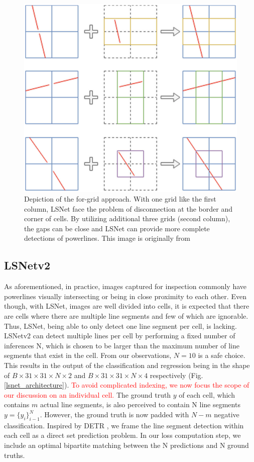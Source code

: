 \documentclass[journal]{IEEEtran}
\begin{document}
\begin{figure}
  \includegraphics[width=\linewidth]{imgs/others/4grid.png}
  \caption{Depiction of the for-grid approach. With one grid like the first column, LSNet face the problem of disconnection at the border and corner of cells. By utilizing additional three grids (second column), the gaps can be close and LSNet can provide more complete detections of powerlines. This image is originally from \cite{Nguyen2020}}
  \label{4grid}
\end{figure}


\subsection{LSNetv2}
As aforementioned, in practice, images captured for inspection commonly have powerlines visually intersecting or being in close proximity to each other. Even though, with LSNet, images are well divided into cells, it is expected that there are cells where there are multiple line segments and few of which are ignorable. Thus, LSNet, being able to only detect one line segment per cell, is lacking. LSNetv2 can detect multiple lines per cell by performing a fixed number of inferences N, which is chosen to be larger than the maximum number of line segments that exist in the cell. From our observations, $N=10$ is a safe choice. This results in the output of the classification and regression being in the shape of $B \times 31 \times 31 \times N \times 2$ and $B \times 31 \times 31 \times N \times 4$ respectively (Fig. \ref{lsnet_architecture}). \textcolor{red}{To avoid complicated indexing, we now focus the scope of our discussion on an individual cell.} The ground truth $y$ of each cell, which contains $m$ actual line segments, is also perceived to contain N line segments $y=\{y_i\}^N_{i-1}$. However, the ground truth is now padded with $N-m$ negative classification. Inspired by DETR \cite{DETR}, we frame the line segment detection within each cell as a direct set prediction problem. In our loss computation step, we include an optimal bipartite matching between the N predictions and N ground truths.
\end{document}
